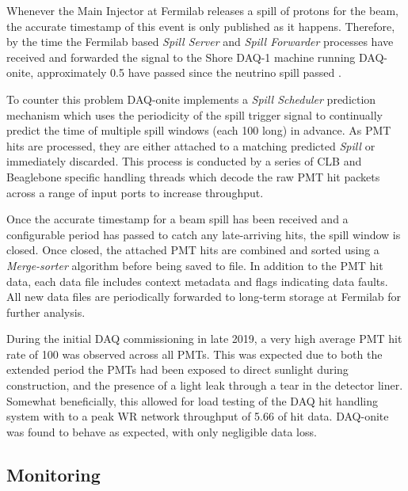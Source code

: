 Whenever the Main Injector at Fermilab releases a spill of protons for the \numi beam, the
accurate timestamp of this event is only published as it happens. Therefore, by the time the
Fermilab based \emph{Spill Server} and \emph{Spill Forwarder} processes have received and
forwarded the signal to the Shore DAQ-1 machine running DAQ-onite, approximately
\SI{0.5}{} have passed since the neutrino spill passed \chipsfive.

To counter this problem DAQ-onite implements a \emph{Spill Scheduler} prediction mechanism which
uses the periodicity of the spill trigger signal to continually predict the time of multiple spill
windows (each \SI{100}{} long) in advance. As PMT hits are processed, they are either
attached to a matching predicted \emph{Spill} or immediately discarded. This process is conducted
by a series of CLB and Beaglebone specific handling threads which decode the raw PMT hit packets
across a range of input ports to increase throughput. 

Once the accurate timestamp for a beam spill has been received and a configurable period has
passed to catch any late-arriving hits, the spill window is closed. Once closed, the attached PMT
hits are combined and sorted using a \emph{Merge-sorter} algorithm before being saved to file. In
addition to the PMT hit data, each data file includes context metadata and flags indicating data
faults. All new data files are periodically forwarded to long-term storage at Fermilab for further
analysis. 

During the initial \chipsfive DAQ commissioning in late 2019, a very high average PMT hit rate of
\SI{100}{} was observed across all PMTs. This was expected due to both the extended
period the PMTs had been exposed to direct sunlight during construction, and the presence of a
light leak through a tear in the detector liner. Somewhat beneficially, this allowed for load
testing of the DAQ hit handling system with to a peak WR network throughput of \SI{5.66}{} of hit data. DAQ-onite was found to behave as expected, with only negligible data
loss.

\subsection{Monitoring} %
\label{sec:daq_soft_monitor} %

